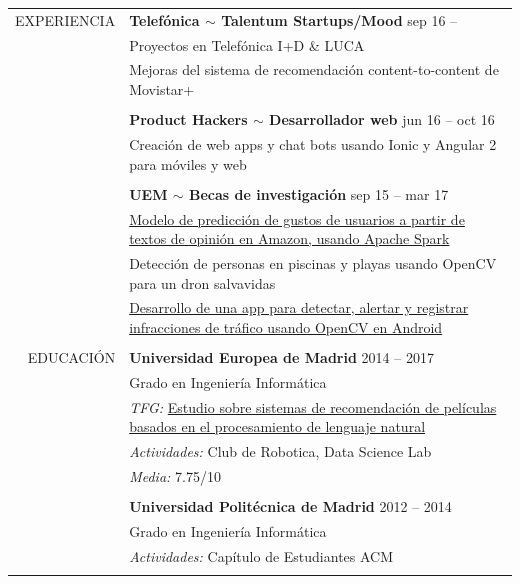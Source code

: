 \documentclass[a4paper, 12pt]{article}
\begin{document}
\begin{longtable}{r|p{12cm}}
    EXPERIENCIA
    & \textbf{Telefónica $\sim$ Talentum Startups/Mood} \hfill sep 16 --
    \\
    & Proyectos en Telefónica I+D \& LUCA
    \\
    & Mejoras del sistema de recomendación content-to-content de Movistar+
    \\\\
    & \textbf{Product Hackers $\sim$ Desarrollador web} \hfill jun 16 -- oct 16
    \\
    & Creación de web apps y chat bots usando Ionic y Angular 2 para móviles y web
    \\\\
    & \textbf{UEM $\sim$ Becas de investigación} \hfill sep 15 -- mar 17
    \\
    & \href{https://www.researchgate.net/publication/314142014_Prediction_of_User_Opinion_for_Products_-_A_Bag-of-Words_and_Collaborative_Filtering_based_Approach}{Modelo de predicción de gustos de usuarios a partir de textos de opinión en Amazon, usando Apache Spark}
    \\
    & Detección de personas en piscinas y playas usando OpenCV para un dron salvavidas
    \\
    & \href{https://github.com/hugo19941994/infrac-coche}{Desarrollo de una app para detectar, alertar y registrar infracciones de tráfico usando OpenCV en Android}
    \\\\
    EDUCACIÓN
    & \textbf{Universidad Europea de Madrid} \hfill 2014 -- 2017
    \\
    & Grado en Ingeniería Informática
    \\
    & \textit{TFG:} \href{https://github.com/hugo19941994/movie-pepper-doc/raw/master/thesis.pdf}{Estudio sobre sistemas de recomendación de películas basados en el procesamiento de lenguaje natural}
    \\
    & \textit{Actividades:} Club de Robotica, Data Science Lab
    \\
    & \textit{Media:} 7.75/10
    \\\\
    & \textbf{Universidad Politécnica de Madrid} \hfill 2012 -- 2014
    \\
    & Grado en Ingeniería Informática
    \\
    & \textit{Actividades:} Capítulo de Estudiantes ACM
    \\\\

\end{longtable}
\end{document}
